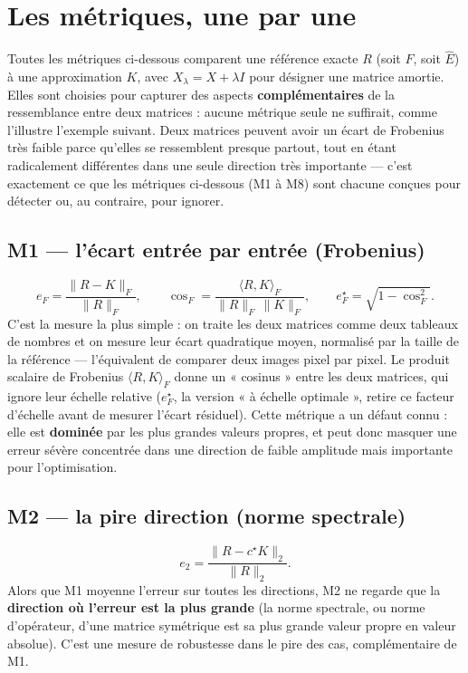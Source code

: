 \documentclass[11pt,a4paper]{article}
\begin{document}
\section{Les métriques, une par une}
\label{sec:metriques}

Toutes les métriques ci-dessous comparent une référence exacte $R$ (soit $F$, soit $\hat E$) à une
approximation $K$, avec $X_\lambda=X+\lambda I$ pour désigner une matrice amortie. Elles sont
choisies pour capturer des aspects \textbf{complémentaires} de la ressemblance entre deux matrices :
aucune métrique seule ne suffirait, comme l'illustre l'exemple suivant. Deux matrices peuvent avoir
un écart de Frobenius très faible parce qu'elles se ressemblent presque partout, tout en étant
radicalement différentes dans une seule direction très importante — c'est exactement ce que les
métriques ci-dessous (M1 à M8) sont chacune conçues pour détecter ou, au contraire, pour ignorer.

\subsection{M1 — l'écart entrée par entrée (Frobenius)}

\[
e_F = \frac{\|R-K\|_F}{\|R\|_F}, \qquad
\cos_F = \frac{\langle R,K\rangle_F}{\|R\|_F\,\|K\|_F}, \qquad
e_F^\star=\sqrt{1-\cos_F^2}.
\]
C'est la mesure la plus simple : on traite les deux matrices comme deux tableaux de nombres et on
mesure leur écart quadratique moyen, normalisé par la taille de la référence — l'équivalent de
comparer deux images pixel par pixel. Le produit scalaire de Frobenius $\langle R,K\rangle_F$ donne
un « cosinus » entre les deux matrices, qui ignore leur échelle relative ($e_F^\star$, la version
« à échelle optimale », retire ce facteur d'échelle avant de mesurer l'écart résiduel). Cette
métrique a un défaut connu : elle est \textbf{dominée} par les plus grandes valeurs propres, et peut
donc masquer une erreur sévère concentrée dans une direction de faible amplitude mais importante
pour l'optimisation.

\subsection{M2 — la pire direction (norme spectrale)}

\[
e_2 = \frac{\|R - c^\star K\|_2}{\|R\|_2}.
\]
Alors que M1 moyenne l'erreur sur toutes les directions, M2 ne regarde que la \textbf{direction où
l'erreur est la plus grande} (la norme spectrale, ou norme d'opérateur, d'une matrice symétrique est
sa plus grande valeur propre en valeur absolue). C'est une mesure de robustesse dans le pire des
cas, complémentaire de M1.
\end{document}
